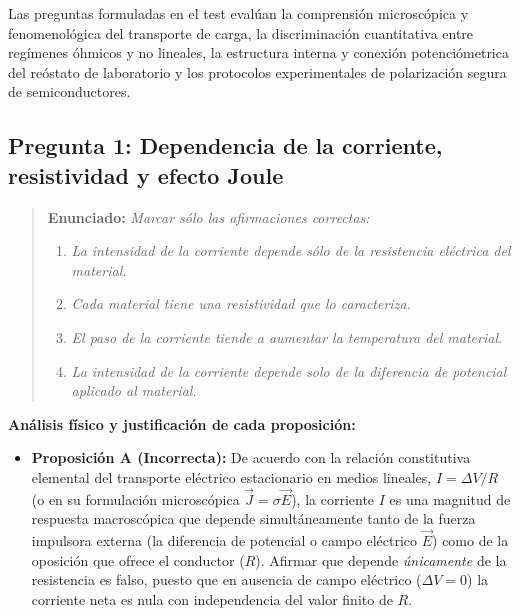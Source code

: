 \begin{appendices}
Las preguntas formuladas en el test evalúan la comprensión microscópica y fenomenológica del transporte de carga, la discriminación cuantitativa entre regímenes óhmicos y no lineales, la estructura interna y conexión potenciómetrica del reóstato de laboratorio y los protocolos experimentales de polarización segura de semiconductores.

\subsection{Pregunta 1: Dependencia de la corriente, resistividad y efecto Joule}

\begin{quote}
    \textbf{Enunciado:} \textit{Marcar sólo las afirmaciones correctas:}
    \begin{enumerate}
        \renewcommand{\theenumi}{\Alph{enumi}}
        \renewcommand{\labelenumi}{\textbf{\theenumi.}}
        \item \textit{La intensidad de la corriente depende sólo de la resistencia eléctrica del material.}
        \item \textit{Cada material tiene una resistividad que lo caracteriza.}
        \item \textit{El paso de la corriente tiende a aumentar la temperatura del material.}
        \item \textit{La intensidad de la corriente depende solo de la diferencia de potencial aplicado al material.}
    \end{enumerate}
\end{quote}

\textbf{Análisis físico y justificación de cada proposición:}
\begin{itemize}
    \item \textbf{Proposición A (Incorrecta):} De acuerdo con la relación constitutiva elemental del transporte eléctrico estacionario en medios lineales, $I = \Delta V / R$ (o en su formulación microscópica $\vec{J} = \sigma \vec{E}$), la corriente $I$ es una magnitud de respuesta macroscópica que depende simultáneamente tanto de la fuerza impulsora externa (la diferencia de potencial o campo eléctrico $\vec{E}$) como de la oposición que ofrece el conductor ($R$). Afirmar que depende \textit{únicamente} de la resistencia es falso, puesto que en ausencia de campo eléctrico ($\Delta V = 0$) la corriente neta es nula con independencia del valor finito de $R$.
    

\end{itemize}
\end{appendices}
